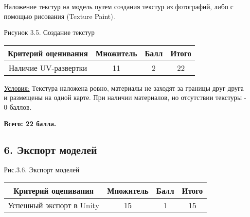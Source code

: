 Наложение текстур на модель путем создания текстур из фотографий, либо с помощью рисования (Texture Paint).



\begin{center}
    Рисунок 3.5. Создание текстур
\end{center}

\begin{table}[H]
    \begin{center}
        \begin{tabular}{|c|c|c|c|}
            \hline
            Критерий оценивания &	Множитель &	Балл &	Итого \\
            \hline
            Наличие UV-развертки &	11 &	2	& 22 \\       
            \hline
        \end{tabular} 
    \end {center} 
\end{table} 

\underline{Условия:} Текстура наложена ровно, материалы не заходят за границы друг друга и размещены на одной карте. При наличии материалов, но отсутствии текстуры - 0 баллов.

\textbf{Всего: 22 балла.}

\subsection*{6. Экспорт моделей}





\begin{center}
    Рис.3.6. Экспорт моделей
\end{center}

\begin{table}[H]
    \begin{center}
        \begin{tabular}{|c|c|c|c|}
            \hline
            Критерий оценивания &	Множитель &	Балл &	Итого \\
            \hline
            Успешный экспорт в Unity & 15 & 1 &	15 \\      
            \hline
        \end{tabular} 
    \end {center} 
\end{table} 

